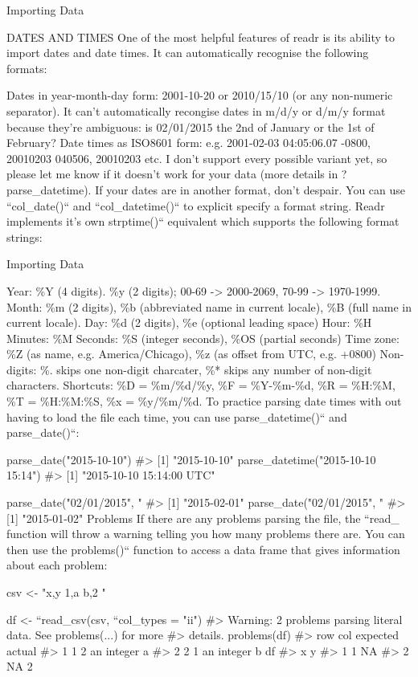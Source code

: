 
{Importing Data}


DATES AND TIMES
One of the most helpful features of readr is its ability to import dates and date times. It can automatically recognise the following formats:

Dates in year-month-day form: 2001-10-20 or 2010/15/10 (or any non-numeric separator). It can’t automatically recongise dates in m/d/y or d/m/y format because they’re ambiguous: is 02/01/2015 the 2nd of January or the 1st of February?
Date times as ISO8601 form: e.g. 2001-02-03 04:05:06.07 -0800, 20010203 040506, 20010203 etc. I don’t support every possible variant yet, so please let me know if it doesn’t work for your data (more details in ?parse_datetime).
If your dates are in another format, don’t despair. You can use ``col_date()`` and ``col_datetime()`` to explicit specify a format string. Readr implements it’s own strptime()`` equivalent which supports the following format strings:



{Importing Data}



Year: \%Y (4 digits). \%y (2 digits); 00-69 -> 2000-2069, 70-99 -> 1970-1999.
Month: \%m (2 digits), \%b (abbreviated name in current locale), \%B (full name in current locale).
Day: \%d (2 digits), \%e (optional leading space)
Hour: \%H
Minutes: \%M
Seconds: \%S (integer seconds), \%OS (partial seconds)
Time zone: \%Z (as name, e.g. America/Chicago), \%z (as offset from UTC, e.g. +0800)
Non-digits: \%. skips one non-digit charcater, \%* skips any number of non-digit characters.
Shortcuts: \%D = \%m/\%d/\%y, \%F = \%Y-\%m-\%d, \%R = \%H:\%M, \%T = \%H:\%M:\%S, \%x = \%y/\%m/\%d.
To practice parsing date times with out having to load the file each time, you can use parse_datetime()`` and parse_date()``:

parse_date("2015-10-10")
#> [1] "2015-10-10"
parse_datetime("2015-10-10 15:14")
#> [1] "2015-10-10 15:14:00 UTC"

parse_date("02/01/2015", "%
#> [1] "2015-02-01"
parse_date("02/01/2015", "%
#> [1] "2015-01-02"
Problems
If there are any problems parsing the file, the ``read_ function will throw a warning telling you how many problems there are. You can then use the problems()`` function to access a data frame that gives information about each problem:

csv <- "x,y
1,a
b,2
"

df <- ``read_csv(csv, ``col_types = "ii")
#> Warning: 2 problems parsing literal data. See problems(...) for more
#> details.
problems(df)
#>   row col   expected actual
#> 1   1   2 an integer      a
#> 2   2   1 an integer      b
df
#>    x  y
#> 1  1 NA
#> 2 NA  2



